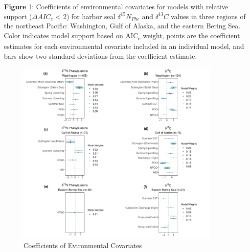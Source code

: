 \documentclass [11pt, proquest] {uwthesis}[2015/03/03]
\begin{document}
\textbf{Figure} \ref{fig:coefres}: Coefficients of environmental
covariates for models with relative support (\(\Delta AIC_c\)
\textless{} 2) for harbor seal \(\delta^{15}N_{Phe}\) and
\(\delta^{13}C\) values in three regions of the northeast Pacific:
Washington, Gulf of Alaska, and the eastern Bering Sea. Color indicates
model support based on AIC\textsubscript{c} weight, points are the
coefficient estimates for each environmental covariate included in an
individual model, and bars show two standard deviations from the
coefficient estimate. \newline 
\begin{figure}[h]
\centering
  \includegraphics[width=0.9\textwidth]{figure/Ch2/Figure5_CoefPlot.pdf}
  \caption{Coefficients of Evironmental Covariates}
  \label{fig:coefres}
\end{figure}
\clearpage
\end{document}
